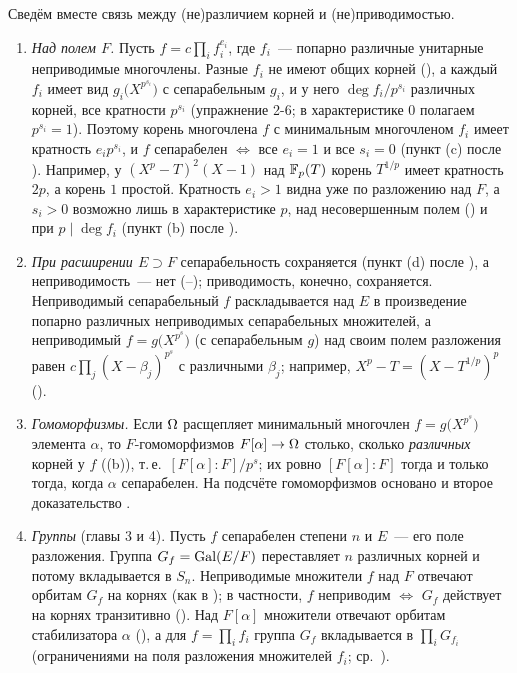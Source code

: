\begin{aside}
Сведём вместе связь между (не)различием корней и (не)приводимостью.
\begin{enumerate}[label=(\arabic*),leftmargin=*]
\item \emph{Над полем $F$.} Пусть $f=c\prod_if_i^{e_i}$, где $f_i$~--- попарно различные унитарные неприводимые
многочлены. Разные $f_i$ не имеют общих корней (), а каждый $f_i$ имеет вид $g_i\bigl(X^{p^{s_i}}\bigr)$ с
сепарабельным $g_i$, и у него $\deg f_i/p^{s_i}$ различных корней, все кратности $p^{s_i}$ (упражнение 2-6; в
характеристике $0$ полагаем $p^{s_i}=1$). Поэтому корень многочлена $f$ с минимальным многочленом $f_i$ имеет кратность
$e_ip^{s_i}$, и $f$ сепарабелен $\iff$ все $e_i=1$ и все $s_i=0$ (пункт (c) после ). Например, у
$(X^p-T)^2(X-1)$ над $\mathbb F_p(T)$ корень $T^{1/p}$ имеет кратность $2p$, а корень $1$ простой. Кратность $e_i>1$ видна уже
по разложению над $F$, а $s_i>0$ возможно лишь в характеристике $p$, над несовершенным полем () и при $p\mid\deg
f_i$ (пункт (b) после ).
\item \emph{При расширении $E\supset F$} сепарабельность сохраняется (пункт (d) после ), а неприводимость~---
нет (--); приводимость, конечно, сохраняется. Неприводимый сепарабельный $f$ раскладывается над $E$
в произведение попарно различных неприводимых сепарабельных множителей, а неприводимый $f=g\bigl(X^{p^s}\bigr)$ (с
сепарабельным $g$) над своим полем разложения равен $c\prod_j(X-\beta_j)^{p^s}$ с различными $\beta_j$; например,
$X^p-T=(X-T^{1/p})^p$ ().
\item \emph{Гомоморфизмы.} Если $\Omega$ расщепляет минимальный многочлен $f=g\bigl(X^{p^s}\bigr)$ элемента $\alpha$, то
$F$-гомоморфизмов $F[\alpha]\to\Omega$ столько, сколько \emph{различных} корней у $f$ ((b)), т.\,е.\
$[F[\alpha]:F]/p^s$; их ровно $[F[\alpha]:F]$ тогда и только тогда, когда $\alpha$ сепарабелен. На подсчёте
гомоморфизмов основано и второе доказательство \rf{2.22g}.
\item \emph{Группы} (главы 3 и 4). Пусть $f$ сепарабелен степени $n$ и $E$~--- его поле разложения. Группа
$G_f=\operatorname{Gal}(E/F)$ переставляет $n$ различных корней и потому вкладывается в $S_n$. Неприводимые множители $f$ над $F$
отвечают орбитам $G_f$ на корнях (как в ); в частности, $f$ неприводим $\iff$ $G_f$ действует на корнях
транзитивно (\rf{4.5}). Над $F[\alpha]$ множители отвечают орбитам стабилизатора $\alpha$ (\rf{2.4d}), а для
$f=\prod_if_i$ группа $G_f$ вкладывается в $\prod_iG_{f_i}$ (ограничениями на поля разложения множителей $f_i$;
ср.\ \rf{3.21}).
\end{enumerate}
\end{aside}
